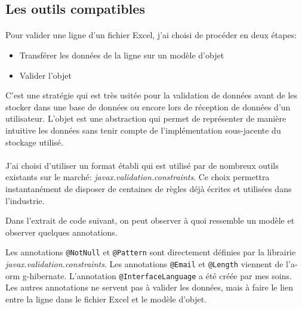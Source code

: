 \subsection{Les outils compatibles}
\label{subsec:compatible-tools}

\paragraph{}
Pour valider une ligne d'un fichier Excel, j'ai choisi de procéder en deux étapes:
\begin{itemize}
    \item Transférer les données de la ligne sur un modèle d'objet
    \item Valider l'objet
\end{itemize}
C'est une stratégie qui est très usitée pour la validation de données avant de les stocker dans une base de données ou encore lors de réception de données d'un utilisateur.
L'objet est une abstraction qui permet de représenter de manière intuitive les données sans tenir compte de l'implémentation sous-jacente du stockage utilisé.

\paragraph{}
J'ai choisi d'utiliser un format établi qui est utilisé par de nombreux outils existants sur le marché: \textit{javax.validation.constraints}.
Ce choix permettra instantanément de disposer de centaines de règles déjà écrites et utilisées dans l'industrie.

Dans l'extrait de code suivant, on peut observer à quoi ressemble un modèle et observer quelques annotations.

Les annotations \lstinline{@NotNull} et \lstinline{@Pattern} sont directement définies par la librairie \textit{javax.validation.constraints}.
Les annotations \lstinline{@Email} et \lstinline{@Length} viennent de l'\gls{a-orm} \Gls{g-hibernate}.
L'annotation \lstinline{@InterfaceLanguage} a été créée par mes soins.
Les autres annotations ne servent pas à valider les données, mais à faire le lien entre la ligne dans le fichier Excel et le modèle d'objet.
